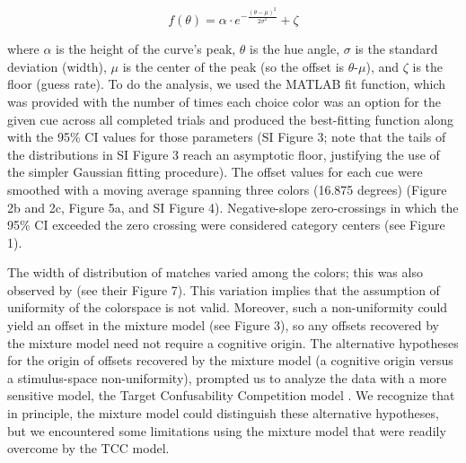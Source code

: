 \begin{equation} \label{eq:GaussianEquation}
    f(\theta) = {\alpha} \cdot e^{-\frac{(\theta-{\mu})^2}{2{\sigma}^2}} + {\zeta}        
\end{equation}



where $\alpha$ is the height of the curve's peak, $\theta$ is the hue angle, $\sigma$ is the standard deviation (width), $\mu$ is the center of the peak (so the offset is $\theta$-$\mu$), and $\zeta$ is the floor (guess rate). 
To do the analysis, we used the MATLAB fit function, which was provided with the number of times each choice color was an option for the given cue across all completed trials and produced the best-fitting function along with the 95\% CI values for those parameters (SI Figure 3; note that the tails of the distributions in SI Figure 3 reach an asymptotic floor, justifying the use of the simpler Gaussian fitting procedure). 
The offset values for each cue were smoothed with a moving average spanning three colors (16.875 degrees) (Figure 2b and 2c, Figure 5a, and SI Figure 4). Negative-slope zero-crossings in which the 95\% CI exceeded the zero crossing were considered category centers (see Figure 1).

The width of distribution of matches varied among the colors; this was also observed by \citet{bae_why_2015} (see their Figure 7). 
This variation implies that the assumption of uniformity of the colorspace is not valid. 
Moreover, such a non-uniformity could yield an offset in the mixture model (see Figure 3), so any offsets recovered by the mixture model need not require a cognitive origin.  
The alternative hypotheses for the origin of offsets recovered by the mixture model (a cognitive origin versus a stimulus-space non-uniformity), prompted us to analyze the data with a more sensitive model, the Target Confusability Competition model \citep{schurgin_psychophysical_2020}.
We recognize that in principle, the mixture model could distinguish these alternative hypotheses, but we encountered some limitations using the mixture model that were readily overcome by the TCC model. 

